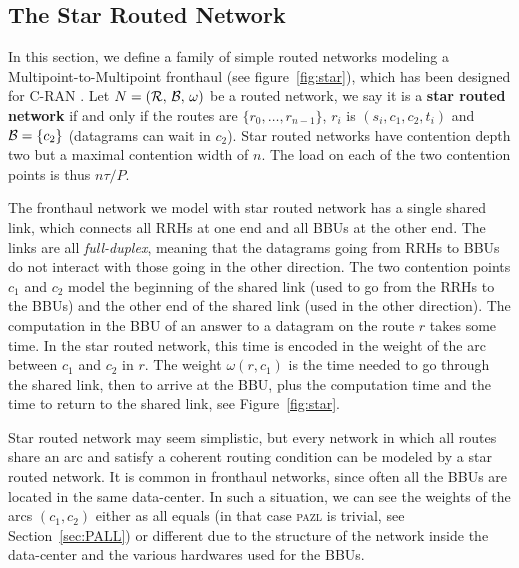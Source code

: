 \documentclass[a4paper,10pt]{article}
\newcommand\pazl{\textsc{pazl}\xspace}
\begin{document}
    \subsection{The Star Routed Network} \label{sec:star_routed_network}
  
	In this section, we define a family of simple routed networks modeling a Multipoint-to-Multipoint fronthaul (see figure~\ref{fig:star}), which has been designed for C-RAN \cite{tayq2017real}. Let $N = (\cal{R},\,\cal{B},\,\omega)$ be a routed network, we say it is a \textbf{star routed network} if and only if the routes are $\{r_0,\dots,r_{n-1}\}$, $r_i$ is $(s_i,c_1,c_2,t_i)$ and ${\cal B} = \{ c_2 \}$ (datagrams can wait in $c_2$). Star routed networks have contention depth two but a maximal contention width of $n$. The load on each of the two contention points is thus $n\tau / P$.

	The fronthaul network we model with star routed network has a single shared link, which connects all RRHs at one end and all BBUs at the other end. The links are all \emph{full-duplex}, meaning that the datagrams going from RRHs to BBUs do not interact with those going in the other direction. 
	The two contention points $c_1$ and $c_2$ model the beginning of the shared link (used to go from the RRHs to the BBUs) and the other end of the shared link (used in the other direction). 
	The computation in the BBU of an answer to a datagram on the route $r$ takes some time.
	In the star routed network, this time is encoded in the weight of the arc between $c_1$ and $c_2$ in $r$. The weight $\omega(r,c_1)$ is the time needed to go through the shared link, then to arrive at the BBU, plus the computation time and the time to return to the shared link, see Figure~\ref{fig:star}.


		Star routed network may seem simplistic, but every network in which all routes share an arc and satisfy a coherent routing condition can be modeled by a star routed network.
		It is common in fronthaul networks, since often all the BBUs are located in the same data-center. In such a situation, we can see the weights of the arcs $(c_1,c_2)$ either as all equals (in that case \pazl is trivial, see Section~\ref{sec:PALL}) or different due to the structure of the network inside the data-center and the various hardwares used for the BBUs. 

      
     
    	
\end{document}
